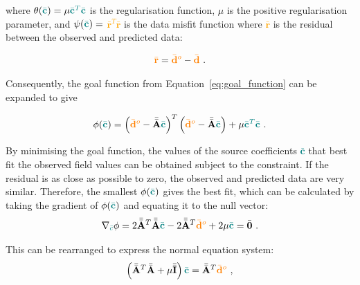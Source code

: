 \noindent
where $\theta(\textcolor{teal}{\bar{\mathbf{c}}}) = \mu \textcolor{teal}{\bar{\mathbf{c}}^T\bar{\mathbf{c}}}$ is the regularisation function, $\mu$ is the positive regularisation parameter, and $\psi(\textcolor{teal}{\bar{\mathbf{c}}}) =$ \textcolor{orange}{$\bar{\mathbf{r}}^T\bar{\mathbf{r}}$} is the data misfit function where \textcolor{orange}{$\bar{\mathbf{r}}$} is the residual between the observed and predicted data:

\begin{equation}
    \label{eqs:resdiual}
    \textcolor{orange}{\bar{\mathbf{r}}} = \textcolor{orange}{\bar{\mathbf{d}}^o} - \textcolor{orange}{\bar{\mathbf{d}}}
    \ .
\end{equation}

\noindent
Consequently, the goal function from Equation~\ref{eq:goal_function} can  be expanded to give

\begin{equation}
    \phi (\textcolor{teal}{\bar{\mathbf{c}}}) = \left(\textcolor{orange}{\bar{\mathbf{d}}^o} - \Bar{\Bar{\mathbf{A}}} \textcolor{teal}{\bar{\mathbf{c}}}\right)^T \left(\textcolor{orange}{\bar{\mathbf{d}}^o} - \Bar{\Bar{\mathbf{A}}} \textcolor{teal}{\bar{\mathbf{c}}}\right) + \mu \textcolor{teal}{\bar{\mathbf{c}}^T\bar{\mathbf{c}}}
    \ .
\end{equation}

\noindent
By minimising the goal function, the values of the source coefficients \textcolor{teal}{$\bar{\mathbf{c}}$} that best fit the observed field values can be obtained subject to the constraint. If the residual is as close as possible to zero, the observed and predicted data are very similar. Therefore, the smallest $\phi(\textcolor{teal}{\bar{\mathbf{c}}})$ gives the best fit, which can be calculated by taking the gradient of $\phi(\textcolor{teal}{\bar{\mathbf{c}}})$ and equating it to the null vector:
\begin{equation}
    \nabla_{\textcolor{teal}{\bar{c}}} \phi = 2 \Bar{\Bar{\mathbf{A}}}^T \Bar{\Bar{\mathbf{A}}} \textcolor{teal}{\Bar{\mathbf{c}}} - 2\Bar{\Bar{\mathbf{A}}}^T\textcolor{orange}{\bar{\mathbf{d}}^o} + 2\mu \textcolor{teal}{\bar{\mathbf{c}}} = \bar{\mathbf{0}}
    \ .
\end{equation}

\noindent
This can be rearranged to express the normal equation system:
\begin{equation}
    \left( \Bar{\Bar{\mathbf{A}}}^T \Bar{\Bar{\mathbf{A}}} +  \mu \bar{\bar{\mathbf{I}}} \right) \textcolor{teal}{\bar{\mathbf{c}}} = 
    \Bar{\Bar{\mathbf{A}}}^T\textcolor{orange}{\bar{\mathbf{d}}^o}
    \ ,
    \label{eq:normal_equations}
\end{equation}

